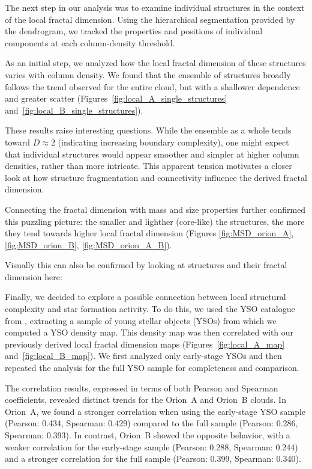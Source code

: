 The next step in our analysis was to examine individual structures in the context of the local fractal dimension.  
Using the hierarchical segmentation provided by the dendrogram, we tracked the properties and positions of individual components at each column-density threshold.

As an initial step, we analyzed how the local fractal dimension of these structures varies with column density.  
We found that the ensemble of structures broadly follows the trend observed for the entire cloud, but with a shallower dependence and greater scatter (Figures~\ref{fig:local_A_single_structures} and~\ref{fig:local_B_single_structures}).  

These results raise interesting questions.  
While the ensemble as a whole tends toward \(D \approx 2\) (indicating increasing boundary complexity), one might expect that individual structures would appear smoother and simpler at higher column densities, rather than more intricate.  
This apparent tension motivates a closer look at how structure fragmentation and connectivity influence the derived fractal dimension.

Connecting the fractal dimension with mass and size properties further confirmed this puzzling picture: the smaller and lighther (core-like) the structures, the more they tend towards higher local fractal dimension (Figures \ref{fig:MSD_orion_A}, \ref{fig:MSD_orion_B}, \ref{fig:MSD_orion_A_B}).

Visually this can also be confirmed by looking at structures and their fractal dimension here:


Finally, we decided to explore a possible connection between local structural complexity and star formation activity. To do this, we used the YSO catalogue from \cite{megeath2012catalogue}, extracting a sample of young stellar objects (YSOs) from which we computed a YSO density map. This density map was then correlated with our previously derived local fractal dimension maps (Figures~\ref{fig:local_A_map} and~\ref{fig:local_B_map}). We first analyzed only early-stage YSOs and then repeated the analysis for the full YSO sample for completeness and comparison.

The correlation results, expressed in terms of both Pearson and Spearman coefficients, revealed distinct trends for the Orion~A and Orion~B clouds. In Orion~A, we found a stronger correlation when using the early-stage YSO sample (Pearson: 0.434, Spearman: 0.429) compared to the full sample (Pearson: 0.286, Spearman: 0.393). In contrast, Orion~B showed the opposite behavior, with a weaker correlation for the early-stage sample (Pearson: 0.288, Spearman: 0.244) and a stronger correlation for the full sample (Pearson: 0.399, Spearman: 0.340).


